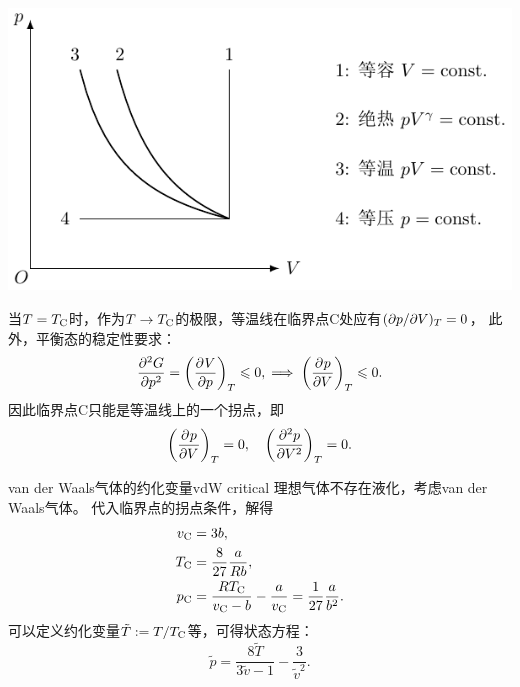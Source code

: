 \begin{center}
	\includegraphics[page=11]{figures/tikz/coordinates.pdf}
	\label{fig:H2O phase P-V}
\end{center}

当$T=T_\crt$时，作为$T\to T_\crt$的极限，等温线在临界点C处应有$(\p p/\p V)_T=0$，
此外，平衡态的稳定性要求：
\[
	\pv[2]Gp=\pu[T]Vp\leq 0,\implies\pu[T]pV\leq 0.
\]
因此临界点C只能是等温线上的一个拐点，即
\begin{equation}
	\label{eq:critical point}
	\pu[T]pV=0,\quad\biggkh{\pv[2]pV}_T=0.
\end{equation}

\begin{example}
	{van der Waals气体的约化变量}{vdW critical}
	理想气体不存在液化，考虑van der Waals气体。
	代入临界点的拐点条件，解得
	\begin{subequations}
		\label{eq:vdW critical}
		\begin{align}
			v_\crt&=3b,\\
			T_\crt&=\frac{8}{27}\frac{a}{Rb},\\
			p_\crt&=\frac{RT_\crt}{v_\crt-b}-\frac a{v_\crt}=\frac1{27}\frac a{b^2}.
		\end{align}
	\end{subequations}
	可以定义约化变量$\tilde T:=T/T_\crt$等，可得状态方程：
	\begin{equation}
		\tilde p=\frac{8\tilde T}{3\tilde v-1}-\frac3{\tilde v^2}.
	\end{equation}
\end{example}

